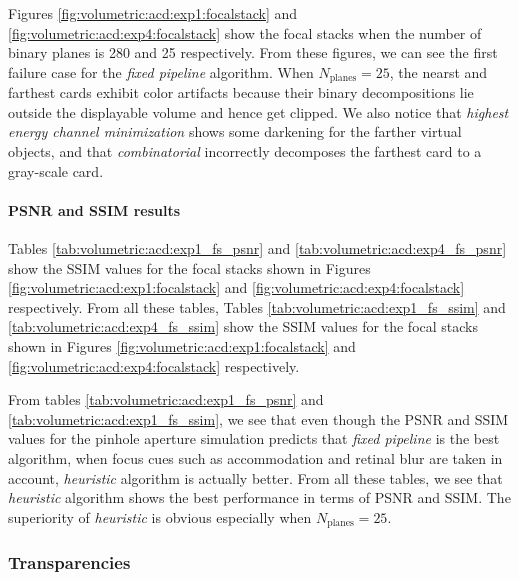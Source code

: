 Figures \ref{fig:volumetric:acd:exp1:focalstack} and \ref{fig:volumetric:acd:exp4:focalstack} show the focal stacks when the number of binary planes is 280 and 25 respectively. From these figures, we can see the first failure case for the \emph{fixed pipeline} algorithm. When $N_{\text{planes}}=25$, the nearst and farthest cards exhibit color artifacts because their binary decompositions lie outside the displayable volume and hence get clipped. We also notice that \emph{highest energy channel minimization} shows some darkening for the farther virtual objects, and that \emph{combinatorial} incorrectly decomposes the farthest card to a gray-scale card. 





\paragraph{PSNR and SSIM results}
Tables \ref{tab:volumetric:acd:exp1_fs_psnr} and \ref{tab:volumetric:acd:exp4_fs_psnr} show the SSIM values for the focal stacks shown in Figures \ref{fig:volumetric:acd:exp1:focalstack} and \ref{fig:volumetric:acd:exp4:focalstack} respectively. From all these tables, 
Tables \ref{tab:volumetric:acd:exp1_fs_ssim} and \ref{tab:volumetric:acd:exp4_fs_ssim} show the SSIM values for the focal stacks shown in Figures \ref{fig:volumetric:acd:exp1:focalstack} and \ref{fig:volumetric:acd:exp4:focalstack} respectively. 

From tables \ref{tab:volumetric:acd:exp1_fs_psnr} and \ref{tab:volumetric:acd:exp1_fs_ssim}, we see that even though the PSNR and SSIM values for the pinhole aperture simulation predicts that \emph{fixed pipeline} is the best algorithm, when focus cues such as accommodation and retinal blur are taken in account, \emph{heuristic} algorithm is actually better. From all these tables, we see that \emph{heuristic} algorithm shows the best performance in terms of PSNR and SSIM. The superiority of \emph{heuristic} is obvious especially when $N_{\text{planes}} = 25$.

\subsubsection{Transparencies}





